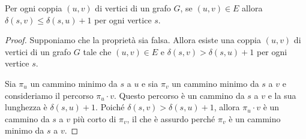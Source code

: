 \begin{propbox}
Per ogni coppia $(u,v)$ di vertici di un grafo $G$, se $(u,v) \in E$ allora $\delta(s,v) \leq \delta(s,u) + 1$ per ogni vertice $s$.
\begin{center}
\end{center}
\end{propbox}

\begin{proof}
	Supponiamo che la proprietà sia falsa. Allora esiste una coppia $(u,v)$ di vertici di un grafo $G$ tale che $(u,v) \in E$ e $\delta(s,v) > \delta(s,u) + 1$ per ogni vertice $s$.

Sia $\pi_{u}$ un cammino minimo da $s$ a $u$ e sia $\pi_{v}$ un cammino minimo da $s$ a $v$ e consideriamo il percorso $\pi_{u} \cdot v$. Questo percorso è un cammino da $s$ a $v$ e la sua lunghezza è $\delta(s,u) + 1$. Poiché $\delta(s,v) > \delta(s,u) + 1$, allora $\pi_{u} \cdot v$ è un cammino da $s$ a $v$ più corto di $\pi_{v}$, il che è assurdo perché $\pi_{v}$ è un cammino minimo da $s$ a $v$.
\end{proof}


